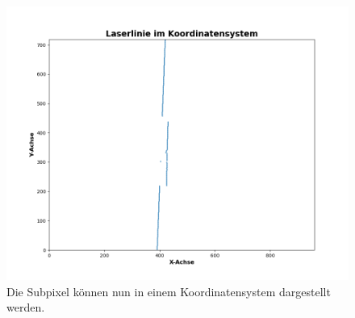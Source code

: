 	\begin{figure}[h]
		\centering
		\includegraphics[width=0.75\linewidth]{img/hauptteil/bildverarbeitung/pixel_koord.png}
		\caption{Die Subpixel können nun in einem Koordinatensystem dargestellt werden.}
		\label{fig:pix_koord}
	\end{figure} 

	\label{chap:erkennen_der_laserlinie}
